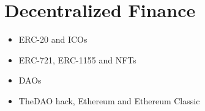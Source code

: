 \chapter{Decentralized Finance}

{\color{red}
\begin{itemize}
\item ERC-20 and ICOs
\item ERC-721, ERC-1155 and NFTs
\item DAOs
\item TheDAO hack, Ethereum and Ethereum Classic
\end{itemize}
}
